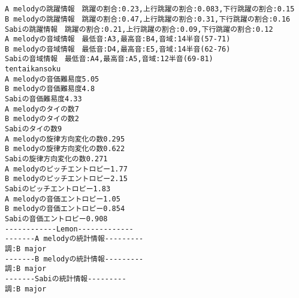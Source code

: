 \documentclass[11pt]{article}
\begin{document}
    \begin{center}
    \end{center}
    { \hspace*{\fill} \\}
    
    \begin{center}
    \end{center}
    { \hspace*{\fill} \\}
    
    \begin{Verbatim}[commandchars=\\\{\}]
A melodyの跳躍情報　跳躍の割合:0.23,上行跳躍の割合:0.083,下行跳躍の割合:0.15
B melodyの跳躍情報　跳躍の割合:0.47,上行跳躍の割合:0.31,下行跳躍の割合:0.16
Sabiの跳躍情報　跳躍の割合:0.21,上行跳躍の割合:0.09,下行跳躍の割合:0.12
A melodyの音域情報　最低音:A3,最高音:B4,音域:14半音(57-71)
B melodyの音域情報　最低音:D4,最高音:E5,音域:14半音(62-76)
Sabiの音域情報　最低音:A4,最高音:A5,音域:12半音(69-81)
tentaikansoku
A melodyの音価難易度5.05
B melodyの音価難易度4.8
Sabiの音価難易度4.33
A melodyのタイの数7
B melodyのタイの数2
Sabiのタイの数9
A melodyの旋律方向変化の数0.295
B melodyの旋律方向変化の数0.622
Sabiの旋律方向変化の数0.271
A melodyのピッチエントロピー1.77
B melodyのピッチエントロピー2.15
Sabiのピッチエントロピー1.83
A melodyの音価エントロピー1.05
B melodyの音価エントロピー0.854
Sabiの音価エントロピー0.908
------------Lemon-------------
-------A melodyの統計情報---------
調:B major
-------B melodyの統計情報---------
調:B major
-------Sabiの統計情報---------
調:B major

    \end{Verbatim}

    \begin{center}
    \end{center}
    { \hspace*{\fill} \\}
    
    \begin{center}
    \end{center}
    { \hspace*{\fill} \\}
    
\end{document}
